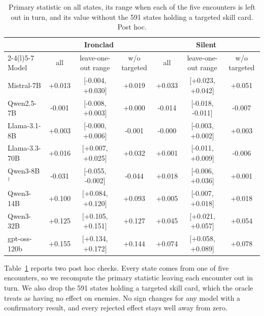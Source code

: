 \begin{table}[t]
\centering
\small
\begin{tabular}{@{}lcccccc@{}}
\toprule
& \multicolumn{3}{c}{Ironclad} & \multicolumn{3}{c}{Silent} \\
\cmidrule(lr){2-4}\cmidrule(l){5-7}
Model & all & leave-one-out range & w/o targeted & all & leave-one-out range & w/o targeted \\
\midrule
Mistral-7B & +0.013 & [-0.004, +0.030] & +0.019 & +0.033 & [+0.023, +0.042] & +0.051 \\
Qwen2.5-7B & -0.001 & [-0.008, +0.003] & +0.000 & -0.014 & [-0.018, -0.011] & -0.007 \\
Llama-3.1-8B & +0.003 & [-0.000, +0.006] & -0.001 & -0.000 & [-0.003, +0.002] & +0.003 \\
Llama-3.3-70B & +0.016 & [+0.007, +0.025] & +0.032 & +0.001 & [-0.011, +0.009] & -0.006 \\
Qwen3-8B$^\dagger$ & -0.031 & [-0.055, -0.002] & -0.044 & +0.018 & [-0.006, +0.036] & +0.001 \\
Qwen3-14B & +0.100 & [+0.084, +0.120] & +0.093 & +0.005 & [-0.007, +0.018] & +0.018 \\
Qwen3-32B & +0.125 & [+0.105, +0.151] & +0.127 & +0.045 & [+0.021, +0.057] & +0.054 \\
gpt-oss-120b & +0.155 & [+0.134, +0.172] & +0.144 & +0.074 & [+0.058, +0.089] & +0.078 \\
\bottomrule
\end{tabular}
\caption{Primary statistic on all states, its range when each of the five encounters is left out in turn, and its value without the 591 states holding a targeted skill card. Post hoc.}
\label{tab:robust}
\end{table}

Table~\ref{tab:robust} reports two post hoc checks. Every state comes from one of five encounters, so we recompute the primary statistic leaving each encounter out in turn. We also drop the 591 states holding a targeted skill card, which the oracle treats as having no effect on enemies. No sign changes for any model with a confirmatory result, and every rejected effect stays well away from zero.

